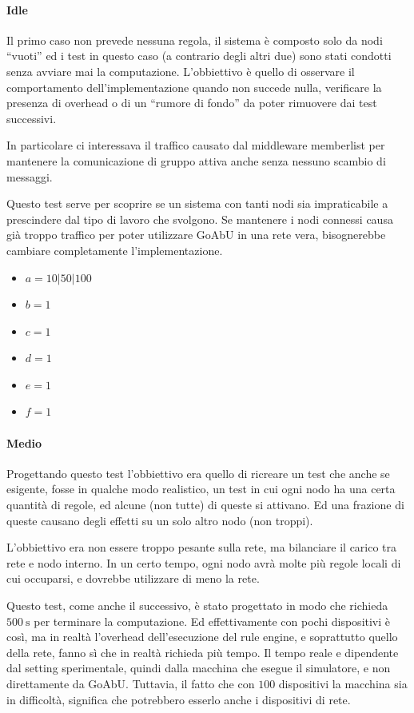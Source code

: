 \documentclass[12pt, a4paper]{article}
\begin{document}
\paragraph{Idle}

Il primo caso non prevede nessuna regola, il sistema è composto solo da nodi ``vuoti'' ed i test in questo caso (a contrario degli altri due) sono stati condotti senza avviare mai la computazione.
L'obbiettivo è quello di osservare il comportamento dell'implementazione quando non succede nulla, verificare la presenza di overhead o di un ``rumore di fondo'' da poter rimuovere dai test successivi.

In particolare ci interessava il traffico causato dal middleware memberlist per mantenere la comunicazione di gruppo attiva anche senza nessuno scambio di messaggi.

Questo test serve per scoprire se un sistema con tanti nodi sia impraticabile a prescindere dal tipo di lavoro che svolgono. Se mantenere i nodi connessi causa già troppo traffico per poter utilizzare GoAbU in una rete vera, bisognerebbe cambiare completamente l'implementazione.

\begin{itemize}
    \item $a=10|50|100$
    \item $b=1$
    \item $c=1$
    \item $d=1$
    \item $e=1$
    \item $f=1$
\end{itemize}

\paragraph{Medio}

Progettando questo test l'obbiettivo era quello di ricreare un test che anche se esigente, fosse in qualche modo realistico, un test in cui ogni nodo ha una certa quantità di regole, ed alcune (non tutte) di queste si attivano. Ed una frazione di queste causano degli effetti su un solo altro nodo (non troppi).

L'obbiettivo era non essere troppo pesante sulla rete, ma bilanciare il carico tra rete e nodo interno. In un certo tempo, ogni nodo avrà molte più regole locali di cui occuparsi, e dovrebbe utilizzare di meno la rete.

Questo test, come anche il successivo, è stato progettato in modo che richieda $\qty{500}{\second}$ per terminare la computazione. Ed effettivamente con pochi dispositivi è così, ma in realtà l'overhead dell'esecuzione del rule engine, e soprattutto quello della rete, fanno sì che in realtà richieda più tempo.
Il tempo reale e dipendente dal setting sperimentale, quindi dalla macchina che esegue il simulatore, e non direttamente da GoAbU. Tuttavia, il fatto che con $100$ dispositivi la macchina sia in difficoltà, significa che potrebbero esserlo anche i dispositivi di rete.
\end{document}
